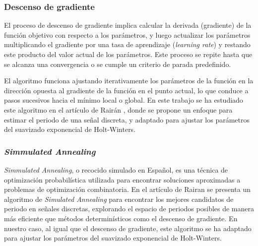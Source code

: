 \subsubsection{Descenso de gradiente} %
El proceso de descenso de gradiente implica calcular la derivada (gradiente) de la función objetivo con respecto a los parámetros, y luego actualizar los parámetros multiplicando el gradiente por una tasa de aprendizaje (\textit{learning rate}) y restando este producto del valor actual de los parámetros. Este proceso se repite hasta que se alcanza una convergencia o se cumple un criterio de parada predefinido.

El algoritmo funciona ajustando iterativamente los parámetros de la función en la dirección opuesta al gradiente de la función en el punto actual, lo que conduce a pasos sucesivos hacia el mínimo local o global. En este trabajo se ha estudiado este algoritmo en el artículo de Rairán \cite{rairan2014two}, donde se propone un enfoque para estimar el periodo de una señal discreta, y adaptado para ajustar los parámetros del suavizado exponencial de Holt-Winters.

\subsubsection{\textit{Simmulated Annealing}} %
\textit{Simmulated Annealing}, o recocido simulado en Español, es una técnica de optimización probabilística utilizada para encontrar soluciones aproximadas a problemas de optimización combinatoria.
En el artículo de Rairan se presenta un algoritmo de \textit{Simulated Annealing} para encontrar los mejores candidatos de periodo en señales discretas, explorando el espacio de periodos posibles de manera más eficiente que métodos determinísticos como el descenso de gradiente.
En nuestro caso, al igual que el descenso de gradiente, este algoritmo se ha adaptado para ajustar los parámetros del suavizado exponencial de Holt-Winters.